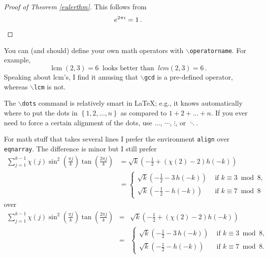 \begin{proof}[Proof of Theorem \ref{eulerthm}]
This follows from
\[
  e^{ 2 \pi i } = 1 \, . \qedhere
\]
\end{proof}

\def\lcm{\operatorname{lcm}}

You can (and should) define your own math operators with {\tt $\backslash$operatorname}. For example,
\[
  \lcm (2, 3) = 6 \ \text{ looks better than } \ lcm (2, 3) = 6 \, .
\]
Speaking about lcm's, I find it amusing that {\tt $\backslash$gcd} is a pre-defined operator, whereas {\tt $\backslash$lcm} is not. 

The {\tt $\backslash$dots} command is relatively smart in \LaTeX; e.g., it knows automatically where to put the dots in $\left\{ 1, 2, \dots, n \right\}$ as compared to $1 + 2 +
\dots + n$.
If you ever need to force a certain alignment of the dots, use $\ldots$, $\cdots$, $\vdots$, or $\ddots$.

For math stuff that takes several lines I prefer the environment {\tt align} over {\tt eqnarray}. The difference is minor but I still prefer
\begin{align*}
  \sum_{ j=1 }^{ k-1 } \chi(j) \sin^2 \left( \frac{ \pi j }{ k } \right) \tan \left( \frac{ 2 \pi j }{ k } \right)
  &= \sqrt k \left( - \frac 1 2 + \left( \chi(2) - 2 \right) h(-k) \right) \\
  &= \begin{cases}
      \sqrt k \left( - \frac 1 2 - 3 \, h(-k) \right) & \text{ if } k \equiv 3 \bmod 8 , \\
      \sqrt k \left( - \frac 1 2 - h(-k) \right) & \text{ if } k \equiv 7 \bmod 8
    \end{cases}
\end{align*}
over
\begin{eqnarray*}
  \sum_{ j=1 }^{ k-1 } \chi(j) \sin^2 \left( \frac{ \pi j }{ k } \right) \tan \left( \frac{ 2 \pi j }{ k } \right)
  &=& \sqrt k \left( - \frac 1 2 + \left( \chi(2) - 2 \right) h(-k) \right) \\
  &=& \begin{cases}
      \sqrt k \left( - \frac 1 2 - 3 \, h(-k) \right) & \text{ if } k \equiv 3 \bmod 8 , \\
      \sqrt k \left( - \frac 1 2 - h(-k) \right) & \text{ if } k \equiv 7 \bmod 8 .
    \end{cases}
\end{eqnarray*}


